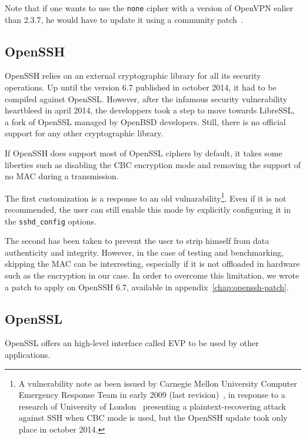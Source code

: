 \noindent Note that if one wants to use the \texttt{none} cipher with a version of OpenVPN ealier than 2.3.7, he would have to update it using a community patch~\cite{openvpn-patch-none}.


\subsection{OpenSSH}
OpenSSH relies on an external cryptographic library for all its security operations.
Up until the version 6.7 published in october 2014, it had to be compiled against OpenSSL.
However, after the infamous security vulnerability heartbleed in april 2014, the developpers took a step to move towards LibreSSL, a fork of OpenSSL managed by OpenBSD  developers.
Still, there is no official support for any other cryptographic library.

If OpenSSH does support most of OpenSSL ciphers by default, it takes some liberties such as disabling the CBC encryption mode and removing the support of no MAC during a transmission.

\noindent The first customization is a response to an old vulnarability\footnote{A vulnerability note as been issued by Carnegie Mellon University Computer Emergency Response Team in early 2009 (last revision)~\cite{CERT2009}, in response to a research of University of London~\cite{Albrecht:2009} presenting a plaintext-recovering attack against SSH when CBC mode is used, but the OpenSSH update took only place in october 2014.}.
Even if it is not recommended, the user can still enable this mode by explicitly configuring it in the \texttt{sshd\_config} options.

\noindent The second has been taken to prevent the user to strip himself from data authenticity and integrity.
However, in the case of testing and benchmarking, skipping the MAC can be interresting, especially if it is not offloaded in hardware such as the encryption in our case.
In order to overcome this limitation, we wrote a patch to apply on OpenSSH 6.7, available in appendix~\ref{chap:openssh-patch}.




\subsection{OpenSSL}

OpenSSL offers an high-level interface called EVP to be used by other applications.


